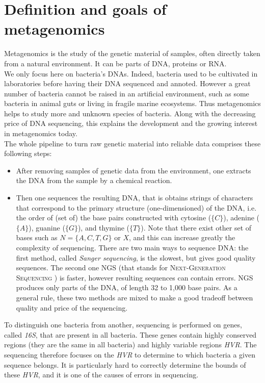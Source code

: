 \documentclass{report}
\begin{document}
\section{Definition and goals of metagenomics}
Metagenomics is the study of the genetic material of samples, often directly taken from a natural environment. It can be parts of DNA, proteins or RNA.\\

We only focus here on bacteria's DNAs. Indeed, bacteria used to be cultivated in laboratories before having their DNA sequenced and annoted. However a great number of bacteria cannot be raised in an artificial environment, such as some bacteria in animal guts or living in fragile marine ecosystems. Thus metagenomics helps to study more and unknown species of bacteria. Along with the decreasing price of DNA sequencing, this explains the development and the growing interest in metagenomics today.\\

The whole pipeline to turn raw genetic material into reliable data comprises these following steps:
\begin{itemize}
\item After removing samples of genetic data from the environment, one extracts the DNA from the sample by a chemical reaction.
\item Then one sequences the resulting DNA, that is obtains strings of characters that correspond to the primary structure (one-dimensioned) of the DNA, i.e. the order of (set of) the base pairs constructed with cytosine ($\{C\}$), adenine ($\{A\}$), guanine ($\{G\}$), and thymine ($\{T\}$). Note that there exist other set of bases such as $N = \{A,C,T,G\}$ or $X$, and this can increase greatly the complexity of sequencing. There are two main ways to sequence DNA: the first method, called \emph{Sanger sequencing}, is the slowest, but gives good quality sequences. The second one NGS (that stands for \textsc{Next-Generation Sequencing} \cite{WikiNGS}) is faster, however resulting sequences can contain errors. NGS produces only parts of the DNA, of length 32 to 1,000 base pairs. As a general rule, these two methods are mixed to make a good tradeoff between quality and price of the sequencing.
\end{itemize}

To distinguish one bacteria from another, sequencing is performed on genes, called \emph{16S}, that are present in all bacteria. These genes contain highly conserved regions (they are the same in all bacteria) and highly variable regions \emph{HVR}. The sequencing therefore focuses on the \emph{HVR} to determine to which bacteria a given sequence belongs. It is particularly hard to correctly determine the bounds of these \emph{HVR}, and it is one of the causes of errors in sequencing.\\
\end{document}
